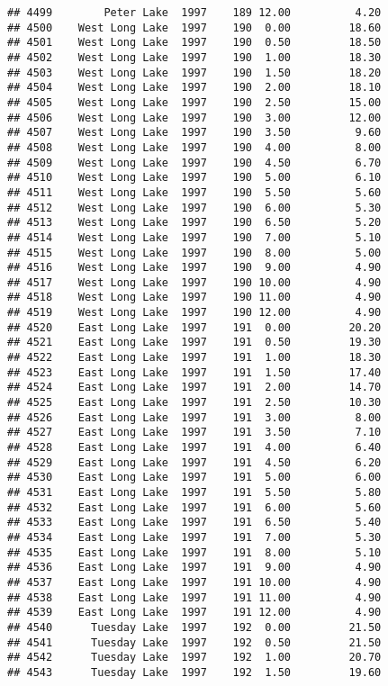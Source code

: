 \documentclass[
]{article}
\begin{document}
\begin{verbatim}
## 4499        Peter Lake  1997    189 12.00          4.20
## 4500    West Long Lake  1997    190  0.00         18.60
## 4501    West Long Lake  1997    190  0.50         18.50
## 4502    West Long Lake  1997    190  1.00         18.30
## 4503    West Long Lake  1997    190  1.50         18.20
## 4504    West Long Lake  1997    190  2.00         18.10
## 4505    West Long Lake  1997    190  2.50         15.00
## 4506    West Long Lake  1997    190  3.00         12.00
## 4507    West Long Lake  1997    190  3.50          9.60
## 4508    West Long Lake  1997    190  4.00          8.00
## 4509    West Long Lake  1997    190  4.50          6.70
## 4510    West Long Lake  1997    190  5.00          6.10
## 4511    West Long Lake  1997    190  5.50          5.60
## 4512    West Long Lake  1997    190  6.00          5.30
## 4513    West Long Lake  1997    190  6.50          5.20
## 4514    West Long Lake  1997    190  7.00          5.10
## 4515    West Long Lake  1997    190  8.00          5.00
## 4516    West Long Lake  1997    190  9.00          4.90
## 4517    West Long Lake  1997    190 10.00          4.90
## 4518    West Long Lake  1997    190 11.00          4.90
## 4519    West Long Lake  1997    190 12.00          4.90
## 4520    East Long Lake  1997    191  0.00         20.20
## 4521    East Long Lake  1997    191  0.50         19.30
## 4522    East Long Lake  1997    191  1.00         18.30
## 4523    East Long Lake  1997    191  1.50         17.40
## 4524    East Long Lake  1997    191  2.00         14.70
## 4525    East Long Lake  1997    191  2.50         10.30
## 4526    East Long Lake  1997    191  3.00          8.00
## 4527    East Long Lake  1997    191  3.50          7.10
## 4528    East Long Lake  1997    191  4.00          6.40
## 4529    East Long Lake  1997    191  4.50          6.20
## 4530    East Long Lake  1997    191  5.00          6.00
## 4531    East Long Lake  1997    191  5.50          5.80
## 4532    East Long Lake  1997    191  6.00          5.60
## 4533    East Long Lake  1997    191  6.50          5.40
## 4534    East Long Lake  1997    191  7.00          5.30
## 4535    East Long Lake  1997    191  8.00          5.10
## 4536    East Long Lake  1997    191  9.00          4.90
## 4537    East Long Lake  1997    191 10.00          4.90
## 4538    East Long Lake  1997    191 11.00          4.90
## 4539    East Long Lake  1997    191 12.00          4.90
## 4540      Tuesday Lake  1997    192  0.00         21.50
## 4541      Tuesday Lake  1997    192  0.50         21.50
## 4542      Tuesday Lake  1997    192  1.00         20.70
## 4543      Tuesday Lake  1997    192  1.50         19.60

\end{verbatim}
\end{document}
